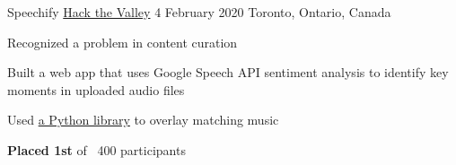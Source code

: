 \begin{cventries}
  \cventry
    {Speechify} %
    {\href{https://hackthevalley.io/}{Hack the Valley} 4} %
    {February 2020} %
    {Toronto, Ontario, Canada} %
    {
      \begin{cvitems} %
        \item{Recognized a problem in content curation}
        \item{Built a web app that uses Google Speech API sentiment analysis to identify key moments in uploaded audio files}
        \item{Used \href{https://pypi.org/project/pydub/}{a Python library} to overlay matching music}
        \item {\textbf{Placed 1st}  of ~400 participants}
      \end{cvitems}
    }

\end{cventries}
